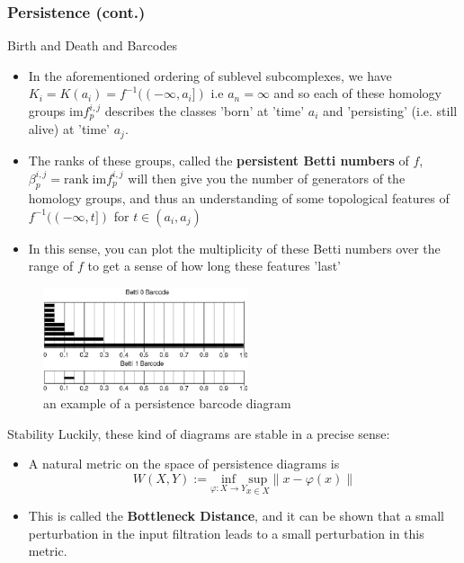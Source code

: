 \documentclass{beamer}
\theoremstyle{definition}
\numberwithin{theorem}{section}
\begin{document}
\begin{frame}
\frametitle{Persistence (cont.)}
	\begin{block}{Birth and Death and Barcodes}
	\begin{itemize}
		\item{In the aforementioned ordering of sublevel subcomplexes, we have $K_i = K(a_i) = f^{-1}((-\infty, a_i])$ i.e $a_n=\infty$ and so each of these homology groups $\mathrm{im}f^{i,j}_p$ describes the classes 'born' at 'time' $a_i$ and 'persisting' (i.e. still alive) at 'time' $a_j$.} 
		\item{The ranks of these groups, called the \textbf{persistent Betti numbers} of $f$, $\beta^{i,j}_p = \mathrm{rank}\; \mathrm{im}f_p^{i,j}$ will then give you the number of generators of the homology groups, and thus an understanding of some topological features of $f^{-1}((-\infty, t])$ for $t\in (a_i, a_j)$} 
		\item{In this sense, you can plot the multiplicity of these Betti numbers over the range of $f$ to get a sense of how long these features 'last'}
	\end{itemize}
	\end{block}
\end{frame}
\begin{frame}[t]
\begin{figure}
		\includegraphics[width = 6cm]{Betti-0-and-Betti-1-persistence-barcode-of-S-50-the-output-from-the-noisy-point-P-in.png}
		\tiny
		\caption{an example of a persistence barcode diagram}
		\end{figure}
\begin{block}{Stability}
\scriptsize
	Luckily, these kind of diagrams are stable in a precise sense: 
	\begin{itemize}
		\item A natural metric on the space of persistence diagrams is $$W(X,Y) := \underset{\varphi: X \rightarrow Y}{\mathrm{inf}} \underset{x \in X}{\mathrm{sup}} \| x - \varphi (x) \|  $$
		\item This is called the \textbf{Bottleneck Distance}, and it can be shown that a small perturbation in the input filtration leads to a small perturbation in this metric. 
	\end{itemize}
\end{block}
\end{frame}
\end{document}
